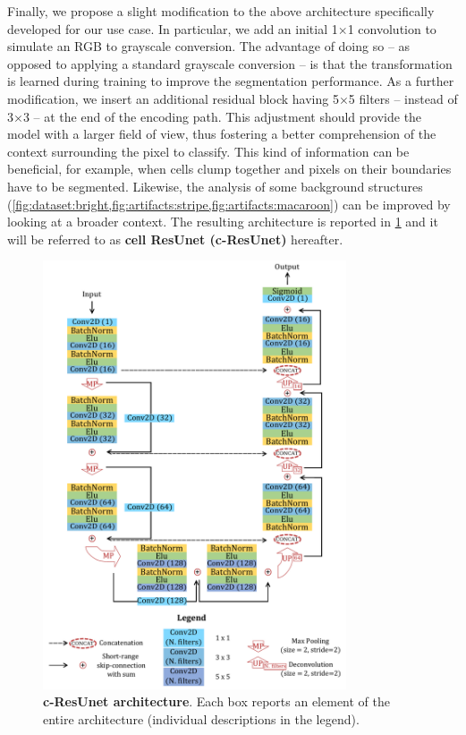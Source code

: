 Finally, we propose a slight modification to the above architecture specifically developed for our use case.
In particular, we add an initial 1$\times$1 convolution to simulate an RGB to grayscale conversion.
The advantage of doing so -- as opposed to applying a standard grayscale conversion -- is that the transformation is learned during training to improve the segmentation performance.
As a further modification, we insert an additional residual block having 5$\times$5 filters -- instead of 3$\times$3 -- at the end of the encoding path. 
This adjustment should provide the model with a larger field of view, thus fostering a better comprehension of the context surrounding the pixel to classify.
This kind of information can be beneficial, for example, when cells clump together and pixels on their boundaries have to be segmented. 
Likewise, the analysis of some background structures (\cref{fig:dataset:bright,fig:artifacts:stripe,fig:artifacts:macaroon}) can be improved by looking at a broader context.
The resulting architecture is reported in \cref{fig:cresunet_architecture} and it will be referred to as \textbf{cell ResUnet (c-ResUnet)} hereafter.

\begin{figure}
\centerline{
\includegraphics[width=0.8\textwidth]{figures/130_methods/c-resunet_architecture.pdf}
}
\caption{\textbf{c-ResUnet architecture}. Each box reports an element of the entire architecture (individual descriptions in the legend). 
} \label{fig:cresunet_architecture}
\end{figure}